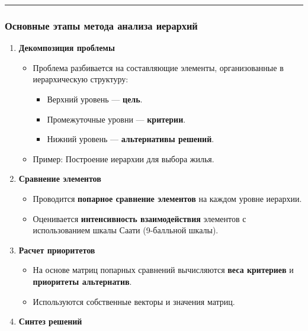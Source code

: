 \documentclass[
]{article}
\providecommand{\tightlist}{%
  \setlength{\itemsep}{0pt}\setlength{\parskip}{0pt}}
\begin{document}
\begin{center}\rule{0.5\linewidth}{0.5pt}\end{center}

\subsubsection{\texorpdfstring{\textbf{Основные этапы метода анализа
иерархий}}{Основные этапы метода анализа иерархий}}\label{ux43eux441ux43dux43eux432ux43dux44bux435-ux44dux442ux430ux43fux44b-ux43cux435ux442ux43eux434ux430-ux430ux43dux430ux43bux438ux437ux430-ux438ux435ux440ux430ux440ux445ux438ux439}

\begin{enumerate}
\def\labelenumi{\arabic{enumi}.}
\item
  \textbf{Декомпозиция проблемы}

  \begin{itemize}
  \tightlist
  \item
    Проблема разбивается на составляющие элементы, организованные в
    иерархическую структуру:

    \begin{itemize}
    \tightlist
    \item
      Верхний уровень --- \textbf{цель}.
    \item
      Промежуточные уровни --- \textbf{критерии}.
    \item
      Нижний уровень --- \textbf{альтернативы решений}.
    \end{itemize}
  \item
    Пример: Построение иерархии для выбора жилья.
  \end{itemize}
\item
  \textbf{Сравнение элементов}

  \begin{itemize}
  \tightlist
  \item
    Проводится \textbf{попарное сравнение элементов} на каждом уровне
    иерархии.
  \item
    Оценивается \textbf{интенсивность взаимодействия} элементов с
    использованием шкалы Саати (9-балльной шкалы).
  \end{itemize}
\item
  \textbf{Расчет приоритетов}

  \begin{itemize}
  \tightlist
  \item
    На основе матриц попарных сравнений вычисляются \textbf{веса
    критериев} и \textbf{приоритеты альтернатив}.
  \item
    Используются собственные векторы и значения матриц.
  \end{itemize}
\item
  \textbf{Синтез решений}


\end{enumerate}
\end{document}
